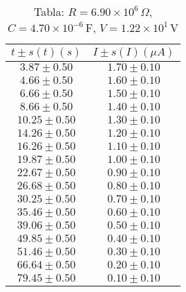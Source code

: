 \begin{table}[H]
\centering
\setlength{\arrayrulewidth}{1.2pt}
\begin{tabular}{|c|c|}
\hline
$t \pm s(t) (s)$ & $I \pm s(I) (\mu A)$ \\
\hline
$3.87 \pm 0.50$ & $1.70 \pm 0.10$ \\
$4.66 \pm 0.50$ & $1.60 \pm 0.10$ \\
$6.66 \pm 0.50$ & $1.50 \pm 0.10$ \\
$8.66 \pm 0.50$ & $1.40 \pm 0.10$ \\
$10.25 \pm 0.50$ & $1.30 \pm 0.10$ \\
$14.26 \pm 0.50$ & $1.20 \pm 0.10$ \\
$16.26 \pm 0.50$ & $1.10 \pm 0.10$ \\
$19.87 \pm 0.50$ & $1.00 \pm 0.10$ \\
$22.67 \pm 0.50$ & $0.90 \pm 0.10$ \\
$26.68 \pm 0.50$ & $0.80 \pm 0.10$ \\
$30.25 \pm 0.50$ & $0.70 \pm 0.10$ \\
$35.46 \pm 0.50$ & $0.60 \pm 0.10$ \\
$39.06 \pm 0.50$ & $0.50 \pm 0.10$ \\
$49.85 \pm 0.50$ & $0.40 \pm 0.10$ \\
$51.46 \pm 0.50$ & $0.30 \pm 0.10$ \\
$66.64 \pm 0.50$ & $0.20 \pm 0.10$ \\
$79.45 \pm 0.50$ & $0.10 \pm 0.10$ \\
\hline
\end{tabular}
\caption*{Tabla: $R = 6.90 \times 10^{6}\,\Omega$, $C = 4.70 \times 10^{-6}$\,F, $V = 1.22 \times 10^{1}$\,V}
\end{table}
